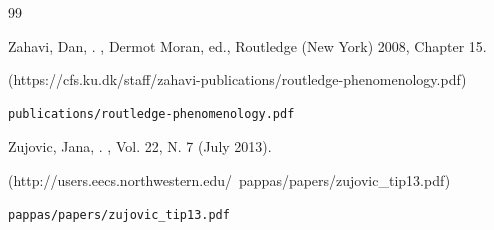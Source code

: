\begin{thebibliography}{99}
{%


\begin{bItem}[DanZahaviChapter]
Zahavi, Dan, 
.
, 
Dermot Moran, ed., Routledge (New York) 2008, Chapter 15. 
%
\begin{boxurl}(https://cfs.ku.dk/staff/zahavi-publications/routledge-phenomenology.pdf)
\begin{lstlisting}
publications/routledge-phenomenology.pdf
\end{lstlisting}
\end{boxurl}\end{bItem}




\begin{bItem}[JanaZujovic]
Zujovic, Jana,
.
, Vol. 22, N. 7 
(July 2013). 
%
\begin{boxurl}(http://users.eecs.northwestern.edu/~pappas/papers/zujovic_tip13.pdf)
\begin{lstlisting}
pappas/papers/zujovic_tip13.pdf
\end{lstlisting}
\end{boxurl}\end{bItem}





\newpage{}


\thispagestyle{bib-last}



\newcommand{\seskip}{\vspace{6pt}}

\newcommand{\selabel}[1]{{\fontfamily{pgm}%
\fontsize{9}{9}\selectfont#1}}




\newcommand{\serefclink}[1]{%
\hyperref[exs:\arabic{serefc}]{%
\textcolor{serefcc}{\arabic{serefc}}}}


\newcommand{\sehyperref}[1]{\pagefref{\getpagerefnumber{exs:#1}}}%






}
\end{thebibliography}
